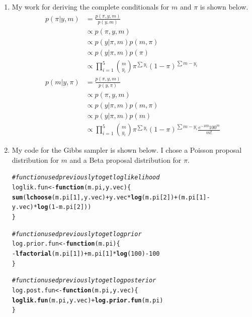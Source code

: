 \documentclass[12pt]{article}\usepackage[]{graphicx}\usepackage[]{color}
\makeatletter
\newcommand{\hlnum}[1]{\textcolor[rgb]{0.686,0.059,0.569}{#1}}%
\newcommand{\hlcom}[1]{\textcolor[rgb]{0.678,0.584,0.686}{\textit{#1}}}%
\newcommand{\hlopt}[1]{\textcolor[rgb]{0,0,0}{#1}}%
\newcommand{\hlstd}[1]{\textcolor[rgb]{0.345,0.345,0.345}{#1}}%
\newcommand{\hlkwa}[1]{\textcolor[rgb]{0.161,0.373,0.58}{\textbf{#1}}}%
\newcommand{\hlkwb}[1]{\textcolor[rgb]{0.69,0.353,0.396}{#1}}%
\newcommand{\hlkwc}[1]{\textcolor[rgb]{0.333,0.667,0.333}{#1}}%
\newcommand{\hlkwd}[1]{\textcolor[rgb]{0.737,0.353,0.396}{\textbf{#1}}}%
\newenvironment{kframe}{%
 \def\at@end@of@kframe{}%
 \ifinner\ifhmode%
  \def\at@end@of@kframe{\end{minipage}}%
  \begin{minipage}{\columnwidth}%
 \fi\fi%
 \def\FrameCommand##1{\hskip\@totalleftmargin \hskip-\fboxsep
 \colorbox{shadecolor}{##1}\hskip-\fboxsep
     \hskip-\linewidth \hskip-\@totalleftmargin \hskip\columnwidth}%
 \MakeFramed {\advance\hsize-\width
   \@totalleftmargin\z@ \linewidth\hsize
   \@setminipage}}%
 {\par\unskip\endMakeFramed%
 \at@end@of@kframe}
\newenvironment{knitrout}{}{} %
\makeatother
\begin{document}
\begin{enumerate}
\begin{enumerate}
\begin{enumerate}
\item My work for deriving the complete conditionals for $m$ and $\pi$ is shown below.
\begin{align*}
p(\pi|y, m) &= \frac{p(\pi, y, m)}{p(y, m)} \\
&\propto p(\pi, y, m) \\
&\propto p(y|\pi, m)p(m, \pi) \\
&\propto p(y|\pi, m)p(\pi) \\
&\propto \prod_{i=1}^{5} {m \choose y_i} \pi^{\sum  y_i} (1-\pi)^{\sum m-y_i} \\
p(m|y, \pi) &= \frac{p(\pi, y, m)}{p(y, \pi)} \\
&\propto p(\pi, y, m) \\
&\propto p(y|\pi, m)p(m, \pi) \\
&\propto p(y|\pi, m)p(m) \\
&\propto \prod_{i=1}^{5} {m \choose y_i} \pi^{\sum  y_i} (1-\pi)^{\sum m-y_i} \frac{e^{-100} 100^m}{m!}
\end{align*}

\item My code for the Gibbs sampler is shown below. I chose a Poisson proposal distribution for $m$ and a Beta proposal distribution for $\pi$.

\begin{knitrout}\footnotesize
{}\color{fgcolor}\begin{kframe}
\begin{alltt}
\hlcom{#function used previously to get log likelihood}
\hlstd{loglik.fun} \hlkwb{<-} \hlkwa{function}\hlstd{(}\hlkwc{m.pi}\hlstd{,} \hlkwc{y.vec}\hlstd{)\{}
  \hlkwd{sum}\hlstd{(}\hlkwd{lchoose}\hlstd{(m.pi[}\hlnum{1}\hlstd{], y.vec)}\hlopt{+}\hlstd{y.vec}\hlopt{*}\hlkwd{log}\hlstd{(m.pi[}\hlnum{2}\hlstd{])}\hlopt{+}\hlstd{(m.pi[}\hlnum{1}\hlstd{]}\hlopt{-}\hlstd{y.vec)}\hlopt{*}\hlkwd{log}\hlstd{(}\hlnum{1}\hlopt{-}\hlstd{m.pi[}\hlnum{2}\hlstd{]))}
\hlstd{\}}

\hlcom{#function used previously to get log prior}
\hlstd{log.prior.fun} \hlkwb{<-} \hlkwa{function}\hlstd{(}\hlkwc{m.pi}\hlstd{) \{}
  \hlopt{-}\hlkwd{lfactorial}\hlstd{(m.pi[}\hlnum{1}\hlstd{])}\hlopt{+}\hlstd{m.pi[}\hlnum{1}\hlstd{]}\hlopt{*}\hlkwd{log}\hlstd{(}\hlnum{100}\hlstd{)}\hlopt{-}\hlnum{100}
\hlstd{\}}

\hlcom{#function used previously to get log posterior}
\hlstd{log.post.fun} \hlkwb{<-} \hlkwa{function}\hlstd{(}\hlkwc{m.pi}\hlstd{,} \hlkwc{y.vec}\hlstd{) \{}
  \hlkwd{loglik.fun}\hlstd{(m.pi, y.vec)} \hlopt{+} \hlkwd{log.prior.fun}\hlstd{(m.pi)}
\hlstd{\}}


\end{alltt}
\end{kframe}
\end{knitrout}
\end{enumerate}
\end{enumerate}
\end{enumerate}
\end{document}
